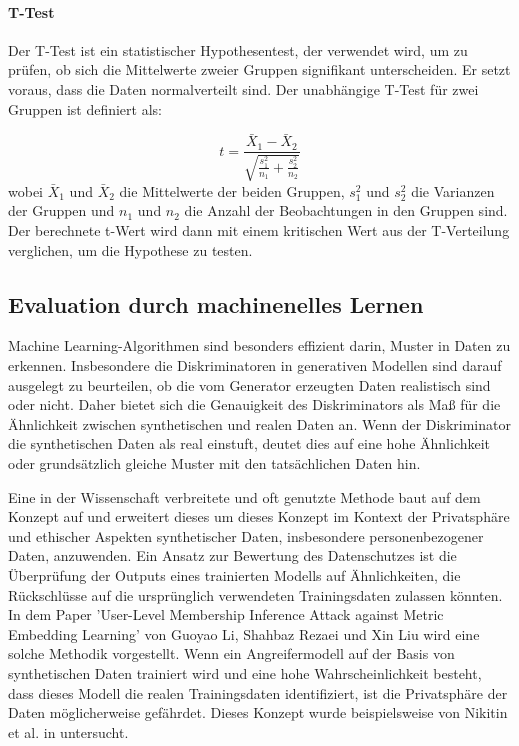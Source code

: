 \paragraph{T-Test}
Der T-Test ist ein statistischer Hypothesentest, der verwendet wird, um zu prüfen, ob sich die Mittelwerte zweier Gruppen signifikant unterscheiden. Er setzt voraus, dass die Daten normalverteilt sind. Der unabhängige T-Test für zwei Gruppen ist definiert als:

\begin{equation}
    t = \frac{\bar{X}_1 - \bar{X}_2}{\sqrt{\frac{s_1^2}{n_1} + \frac{s_2^2}{n_2}}}
\end{equation}
wobei \( \bar{X}_1 \) und \( \bar{X}_2 \) die Mittelwerte der beiden Gruppen, \( s_1^2 \) und \( s_2^2 \) die Varianzen der Gruppen und \( n_1 \) und \( n_2 \) die Anzahl der Beobachtungen in den Gruppen sind. Der berechnete t-Wert wird dann mit einem kritischen Wert aus der T-Verteilung verglichen, um die Hypothese zu testen.




\subsection{Evaluation durch machinenelles Lernen}
\label{sec:ml_methods_evaluation}
Machine Learning-Algorithmen sind besonders effizient darin, Muster in Daten zu erkennen. Insbesondere die Diskriminatoren in generativen Modellen sind 
darauf ausgelegt zu beurteilen, ob die vom Generator erzeugten Daten realistisch sind oder nicht. 
Daher bietet sich die Genauigkeit des Diskriminators als Maß für die Ähnlichkeit zwischen synthetischen und realen Daten an. Wenn der Diskriminator die 
synthetischen Daten als real einstuft, deutet dies auf eine hohe Ähnlichkeit oder grundsätzlich gleiche Muster mit den tatsächlichen Daten hin.

Eine in der Wissenschaft verbreitete und oft genutzte Methode baut auf dem Konzept auf und erweitert dieses um dieses Konzept im Kontext der Privatsphäre und ethischer 
Aspekten synthetischer Daten, insbesondere personenbezogener Daten, anzuwenden. 
Ein Ansatz zur Bewertung des Datenschutzes ist die Überprüfung der Outputs eines trainierten Modells auf Ähnlichkeiten, die Rückschlüsse auf die ursprünglich verwendeten Trainingsdaten zulassen könnten. 
In dem Paper 'User-Level Membership Inference Attack against Metric Embedding Learning' von Guoyao Li, Shahbaz Rezaei und Xin Liu \cite{li2022userlevel} wird eine solche Methodik vorgestellt. 
Wenn ein Angreifermodell auf der Basis von synthetischen Daten trainiert wird und eine hohe Wahrscheinlichkeit besteht, dass dieses Modell die realen Trainingsdaten identifiziert, ist die Privatsphäre der Daten möglicherweise gefährdet. 
Dieses Konzept wurde beispielsweise von Nikitin et al. in \cite{nikitin2023tsgm} untersucht.

